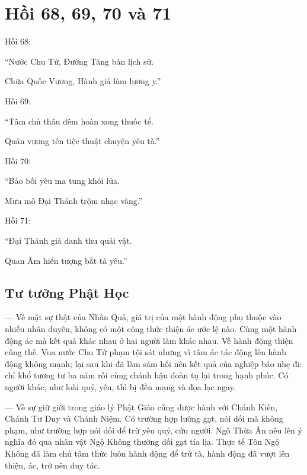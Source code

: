 \chapter{Hồi 68, 69, 70 và 71} %
\label{cha:hoi_68_69}

Hồi 68:

\begin{itshape}
``Nước Chu Tử, Đường Tăng bàn lịch sử.

Chữa Quốc Vương, Hành giả làm lương y.''
\end{itshape}

Hồi 69:

\begin{itshape}
``Tâm chủ thâu đêm hoàn xong thuốc tể.

Quân vương tên tiệc thuật chuyện yêu tà.''
\end{itshape}

Hồi 70:

\begin{itshape}
``Bảo bối yêu ma tung khói lửa.

Mưu mô Đại Thánh trộm nhạc vàng.''
\end{itshape}

Hồi 71:

\begin{itshape}
``Đại Thánh giả danh thu quái vật.

Quan Âm hiển tượng bắt tà yêu.''
\end{itshape}

\section{Tư tưởng Phật Học} %
\label{sec:68_69_phat_hoc}

— Về mặt sự thật của Nhân Quả, giá trị của một hành động phụ thuộc vào nhiều nhân duyên, không có một công thức thiện ác ước lệ nào. Cùng một hành động ác mà kết quả khác nhau ở hai người làm khác nhau. Về hành động thiện cũng thế. Vua nước Chu Tử phạm tội sát nhưng vì tâm ác tác động lên hành động không mạnh; lại sau khi đã làm sám hối nên kết quả của nghiệp báo nhẹ đi: chỉ khổ tương tư ba năm rồi cùng chánh hậu đoàn tụ lại trong hạnh phúc. Có người khác, như loài quỷ, yêu, thì bị đền mạng và đọa lạc ngay.

— Về sự giữ giới trong giáo lý Phật Giáo cũng được hành với Chánh Kiến, Chánh Tư Duy và Chánh Niệm. Có trường hợp lường gạt, nói dối mà không phạm, như trường hợp nói dối để trừ yêu quỷ, cứu người. Ngô Thừa Ân nêu lên ý nghĩa đó qua nhân vật Ngộ Không thường dối gạt tía lịa. Thực tế Tôn Ngộ Không đã làm chủ tâm thức luôn hành động để trừ tà, hành động đã vượt lên thiện, ác, trở nên duy tác.

